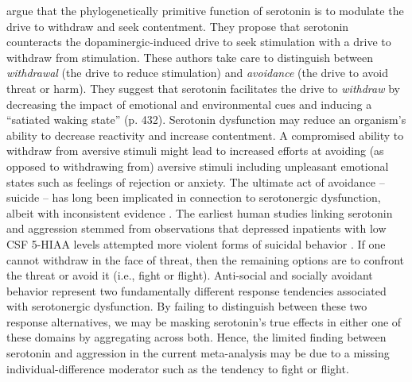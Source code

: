 \textcite{Tops2009} argue that the phylogenetically primitive function of serotonin is to modulate the drive to withdraw and seek contentment. They propose that serotonin counteracts the dopaminergic-induced drive to seek stimulation with a drive to withdraw from stimulation. These authors take care to distinguish between \emph{withdrawal} (the drive to reduce stimulation) and \emph{avoidance} (the drive to avoid threat or harm). They suggest that serotonin facilitates the drive to \emph{withdraw} by decreasing the impact of emotional and environmental cues and inducing a ``satiated waking state'' (p. 432). Serotonin dysfunction may reduce an organism's ability to decrease reactivity and increase contentment. A compromised ability to withdraw from aversive stimuli might lead to increased efforts at avoiding (as opposed to withdrawing from) aversive stimuli including unpleasant emotional states such as feelings of rejection or anxiety. The ultimate act of avoidance -- suicide -- has long been implicated in connection to serotonergic dysfunction, albeit with inconsistent evidence \parencite[e.g.,][]{Lester1995}. The earliest human studies linking serotonin and aggression stemmed from observations that depressed inpatients with low CSF 5-HIAA levels attempted more violent forms of suicidal behavior \parencite[e.g.,][]{Asberg76, Asberg762}. If one cannot withdraw in the face of threat, then the remaining options are to confront the threat or avoid it (i.e., fight or flight). Anti-social and socially avoidant behavior represent two fundamentally different response tendencies associated with serotonergic dysfunction. By failing to distinguish between these two response alternatives, we may be masking serotonin's true effects in either one of these domains by aggregating across both. Hence, the limited finding between serotonin and aggression in the current meta-analysis may be due to a missing individual-difference moderator such as the tendency to fight or flight. 


